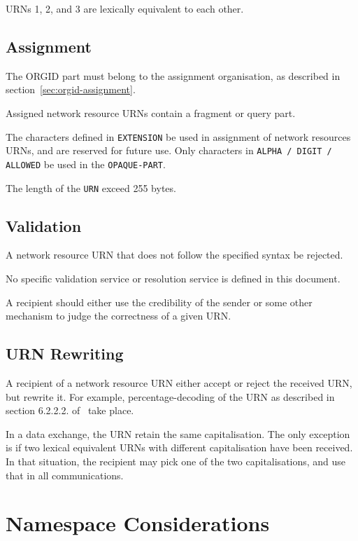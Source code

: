 \documentclass[12pt]{article}  %
\begin{document}
URNs 1, 2, and 3 are lexically equivalent to each other. 

\subsection{Assignment}

The ORGID part must belong to the assignment organisation, as described in 
section~\ref{sec:orgid-assignment}.

Assigned network resource URNs \MUSTNOT{} contain a fragment or query part.

The characters defined in \texttt{EXTENSION} \SHOULDNOT{} be used in assignment 
of network resources URNs, and are reserved for future use. 
Only characters in \texttt{ALPHA / DIGIT / ALLOWED} \SHOULD{} be used in the \texttt{OPAQUE-PART}.

The length of the \texttt{URN} \MUSTNOT{} exceed 255 bytes.

\subsection{Validation}

A network resource URN that does not follow the specified syntax \SHOULD{} be rejected.

No specific validation service or resolution service is defined in this document.

A recipient should either use the credibility of the sender or some other mechanism to 
judge the correctness of a given URN.

\subsection{URN Rewriting}

A recipient of a network resource URN \MUST{} either accept or reject 
the received URN, but \MUSTNOT{} rewrite it.
For example, percentage-decoding of the URN as described in section 6.2.2.2. 
of~\cite{rfc3986} \MUSTNOT{} take place.

In a data exchange, the URN \SHOULD{} retain the same capitalisation. 
The only exception is if two lexical equivalent URNs with different capitalisation 
have been received. In that situation, the recipient may pick one of the two 
capitalisations, and use that in all communications.

\section{Namespace Considerations}
\end{document}
